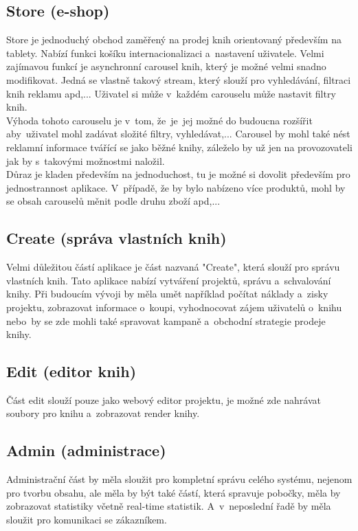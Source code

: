 \documentclass[a4paper,12pt,twoside,BCOR=10mm]{article}
\begin{document}
\subsection{Store (e-shop)}\label{sec:store}
Store je jednoduchý obchod zaměřený na prodej knih orientovaný především na tablety. Nabízí funkci košíku internacionalizaci a~nastavení uživatele. Velmi zajímavou funkcí je asynchronní carousel knih, který je možné velmi snadno modifikovat. Jedná se vlastně takový stream, který slouží pro vyhledávání, filtraci knih reklamu apd,... Uživatel si může v~každém carouselu může nastavit filtry knih.\\
Výhoda tohoto carouselu je v~tom, že~je~jej možné do budoucna rozšířit aby~uživatel mohl zadávat složité filtry, vyhledávat,... Carousel by mohl také nést reklamní informace tvářící se jako běžné knihy, záleželo by už jen na provozovateli jak by s~takovými možnostmi naložil.\\
Důraz je kladen především na jednoduchost, tu je možné si dovolit především pro jednostrannost aplikace. V~případě, že by bylo nabízeno více produktů, mohl by se obsah carouselů měnit podle druhu zboží apd,...

\subsection{Create (správa vlastních knih)}\label{sec:create}
Velmi důležitou částí aplikace je část nazvaná "Create", která slouží pro správu vlastních knih. Tato aplikace nabízí vytváření projektů, správu a~schvalování knihy. Při budoucím vývoji by měla umět například počítat náklady a~zisky projektu, zobrazovat informace o~koupi, vyhodnocovat zájem uživatelů o~knihu nebo~by se zde mohli také spravovat kampaně a~obchodní strategie prodeje knihy.

\subsection{Edit (editor knih)}\label{sec:edit}
Část edit slouží pouze jako webový editor projektu, je možné zde nahrávat soubory pro knihu a~zobrazovat render knihy.

\subsection{Admin (administrace)}\label{sec:admin}
Administrační část by měla sloužit pro kompletní správu celého systému, nejenom pro tvorbu obsahu, ale měla by být také částí, která spravuje pobočky, měla by zobrazovat statistiky včetně real-time statistik. A~v~neposlední řadě by měla sloužit pro komunikaci se zákazníkem.
\end{document}
